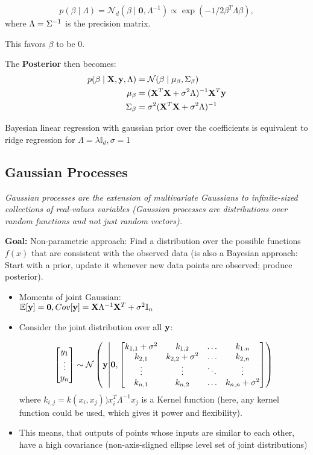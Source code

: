 $$
	p(\beta\mid\Lambda) = \mathcal N_d(\beta\mid\mathbf 0, \Lambda^{-1})\propto \exp(-1/2 \beta^T\Lambda\beta),
$$
where $\Lambda = {\Sigma}^{-1}$ is the precision matrix.

This favors $\beta$ to be $0$. 

The \textbf{Posterior} then becomes:
\begin{align*}
	p(\beta\mid \mathbf X, \mathbf y, \Lambda) &= \mathcal{N} (\beta\mid\mu_\beta, \Sigma_{\beta})\\
							\mu_\beta	&= (\mathbf X^T \mathbf X + \sigma^2\Lambda)^{-1}\mathbf X^T \mathbf y \\
							\Sigma_\beta &= \sigma^2(\mathbf X^T \mathbf X + \sigma^2\Lambda)^{-1}
\end{align*}

Bayesian linear regression with gaussian prior over the coefficients is equivalent to ridge regression for $\Lambda =\lambda \mathbb I_d, \sigma=1$

\subsection{Gaussian Processes}

\textit{Gaussian processes are the extension of multivariate Gaussians to infinite-sized collections of real-values variables (Gaussian processes are distributions over random functions and not just random vectors).}

\vspace{1em}
\textbf{Goal: } Non-parametric approach: Find a distribution over the possible functions $f(x)$ that are consistent with the observed data (is also a Bayesian approach: Start with a prior, update it whenever new data points are observed; produce posterior).
\begin{itemize}
	\item Moments of joint Gaussian:\\
	 $\mathbb E[\mathbf y] = \mathbf 0, Cov[\mathbf y] = \mathbf X\Lambda^{-1}\mathbf X^T + \sigma^2\mathbb{I}_n$
	\item Consider the joint distribution over all $\mathbf y$:

	$$
		\begin{bmatrix}
			y_1 \\ \vdots \\ y_n
		\end{bmatrix}
			\sim \mathcal N \left(
		\mathbf y
		\middle\vert
		\mathbf 0,
			\begin{bmatrix}
				k_{1,1} + \sigma^2 & k_{1,2} & \hdots & k_{1.n} \\
				k_{2,1} & k_{2,2} + \sigma^2 & \hdots & k_{2,n} \\
				\vdots & \vdots & \ddots  & \vdots \\
				k_{n,1} & k_{n,2} & \hdots & k_{n,n} + \sigma^2
			\end{bmatrix}
		\right)
	$$
	where $k_{i,j} = k(x_i, x_j) ) x_i^T\Lambda^{-1} x_j$ is a Kernel function (here, any kernel function could be used, which gives it power and flexibility).
	\item This means, that outputs of points whose inputs are similar to each other, have a high covariance (non-axis-sligned ellipse level set of joint distributions)
\end{itemize}

